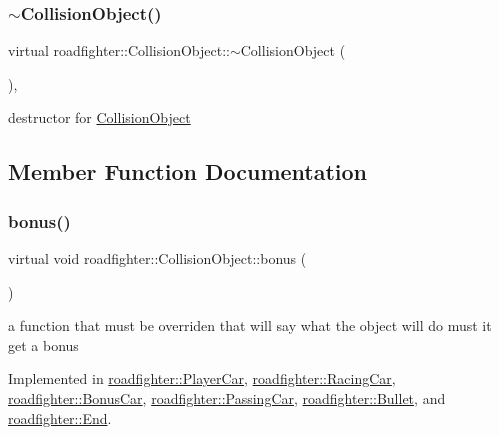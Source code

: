 \subsubsection{\texorpdfstring{$\sim$\+Collision\+Object()}{~CollisionObject()}}
{\footnotesize\ttfamily virtual roadfighter\+::\+Collision\+Object\+::$\sim$\+Collision\+Object (\begin{DoxyParamCaption}{ }\end{DoxyParamCaption})\hspace{0.3cm}{\ttfamily [virtual]}, {\ttfamily [default]}}

destructor for \hyperlink{classroadfighter_1_1CollisionObject}{Collision\+Object} 

\subsection{Member Function Documentation}
\mbox{\label{classroadfighter_1_1CollisionObject_a157e499c27619ceefd6179a459fafd90}} 
\subsubsection{\texorpdfstring{bonus()}{bonus()}}
{\footnotesize\ttfamily virtual void roadfighter\+::\+Collision\+Object\+::bonus (\begin{DoxyParamCaption}{ }\end{DoxyParamCaption})\hspace{0.3cm}{\ttfamily [pure virtual]}}

a function that must be overriden that will say what the object will do must it get a bonus 

Implemented in \hyperlink{classroadfighter_1_1PlayerCar_a0f0626a6ea7d25e3ba01a8289d54acac}{roadfighter\+::\+Player\+Car}, \hyperlink{classroadfighter_1_1RacingCar_a5858dd3f2c7bb49782b29c0a90846a6c}{roadfighter\+::\+Racing\+Car}, \hyperlink{classroadfighter_1_1BonusCar_a3d2d15df036c419cd9ad4fbc6fcd4ad9}{roadfighter\+::\+Bonus\+Car}, \hyperlink{classroadfighter_1_1PassingCar_a43d55e28efe840d81c1b87216920eb69}{roadfighter\+::\+Passing\+Car}, \hyperlink{classroadfighter_1_1Bullet_a642ca8467a0ffea844d18d4917b2f49e}{roadfighter\+::\+Bullet}, and \hyperlink{classroadfighter_1_1End_a501a09cafb9de82e3a6af39e9524eb3d}{roadfighter\+::\+End}.

